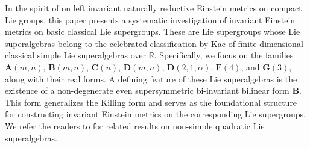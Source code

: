 \documentclass[reqno]{amsart}
\theoremstyle{definition}
\begin{document}
In the spirit of \cite{dz79} on left invariant naturally reductive Einstein metrics on compact Lie groups, this paper presents a systematic investigation of invariant Einstein metrics on basic classical Lie supergroups.
 These are Lie supergroups whose Lie superalgebras belong to the celebrated classification by Kac \cite{Kac} of finite dimensional classical simple Lie superalgebras over $\mathbb{R}$. Specifically, we focus on the families $\mathbf{A}(m,n)$, $\mathbf{B}(m,n)$, $\mathbf{C}(n)$, $\mathbf{D}(m,n)$, $\mathbf{D}(2,1;\alpha)$, $\mathbf{F}(4)$, and $\mathbf{G}(3)$, along with their real forms. A defining feature  of these Lie superalgebras is the existence of a non-degenerate even supersymmetric bi-invariant bilinear form $\mathbf{B}$. This form generalizes the Killing form and serves as the foundational structure for constructing invariant Einstein metrics on the corresponding Lie supergroups.
We refer the readers to \cite{ABB09,BB99,Benayadi00} for related results on non-simple quadratic Lie superalgebras.
\end{document}
